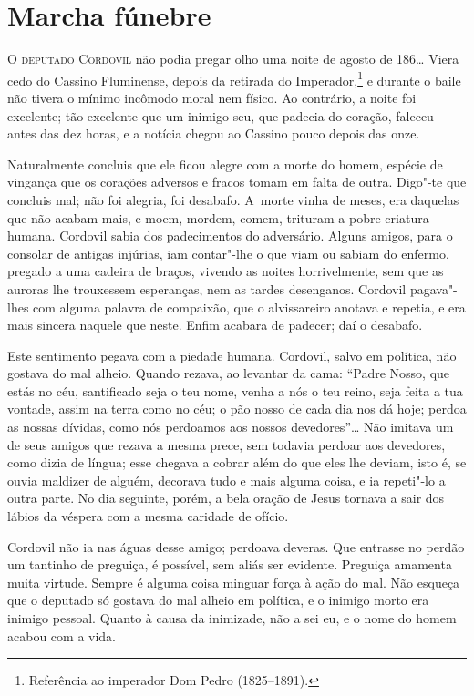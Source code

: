 \chapter{Marcha fúnebre}

\begin{linenumbers}

\textsc{O deputado Cordovil} não podia pregar olho uma noite de agosto de 186\ldots{}
Viera cedo do Cassino Fluminense, depois da retirada do
Imperador,\footnote{Referência ao imperador Dom Pedro  (1825--1891).} e
durante o baile não tivera o mínimo incômodo moral nem físico. Ao
contrário, a noite foi excelente; tão excelente que um inimigo seu, que
padecia do coração, faleceu antes das dez horas, e a notícia chegou ao
Cassino pouco depois das onze.

Naturalmente concluis que ele ficou alegre com a morte do homem, espécie
de vingança que os corações adversos e fracos tomam em falta de outra.
Digo"-te que concluis mal; não foi alegria, foi desabafo. A~morte vinha
de meses, era daquelas que não acabam mais, e moem, mordem, comem,
trituram a pobre criatura humana. Cordovil sabia dos padecimentos do
adversário. Alguns amigos, para o consolar de antigas injúrias, iam
contar"-lhe o que viam ou sabiam do enfermo, pregado a uma cadeira de
braços, vivendo as noites horrivelmente, sem que as auroras lhe
trouxessem esperanças, nem as tardes desenganos. Cordovil pagava"-lhes
com alguma palavra de compaixão, que o alvissareiro anotava e repetia, e
era mais sincera naquele que neste. Enfim acabara de padecer; daí o
desabafo.

Este sentimento pegava com a piedade humana. Cordovil, salvo em
política, não gostava do mal alheio. Quando rezava, ao levantar da cama:
``Padre Nosso, que estás no céu, santificado seja o teu nome, venha a
nós o teu reino, seja feita a tua vontade, assim na terra como no céu; o
pão nosso de cada dia nos dá hoje; perdoa as nossas dívidas, como nós
perdoamos aos nossos devedores''\ldots{} Não imitava um de seus amigos que
rezava a mesma prece, sem todavia perdoar aos devedores, como dizia de
língua; esse chegava a cobrar além do que eles lhe deviam, isto é, se
ouvia maldizer de alguém, decorava tudo e mais alguma coisa, e ia
repeti"-lo a outra parte. No dia seguinte, porém, a bela oração de Jesus
tornava a sair dos lábios da véspera com a mesma caridade de ofício.

Cordovil não ia nas águas desse amigo; perdoava deveras. Que entrasse no
perdão um tantinho de preguiça, é possível, sem aliás ser evidente.
Preguiça amamenta muita virtude. Sempre é alguma coisa minguar força à
ação do mal. Não esqueça que o deputado só gostava do mal alheio em
política, e o inimigo morto era inimigo pessoal. Quanto à causa da
inimizade, não a sei eu, e o nome do homem acabou com a vida.


\end{linenumbers}
